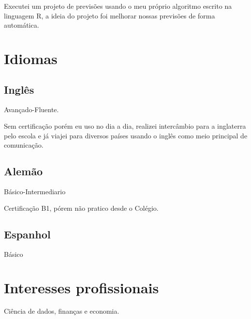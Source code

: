 \documentclass[11pt, a4paper]{awesome-cv}
\begin{document}
Executei um projeto de previsões usando o meu próprio algoritmo escrito na linguagem R, a ideia do projeto foi melhorar nossas previsões de forma automática.

\hypertarget{idiomas}{%
\section{Idiomas}\label{idiomas}}

\hypertarget{ingluxeas}{%
\subsection{Inglês}\label{ingluxeas}}

Avançado-Fluente.

Sem certificação porém eu uso no dia a dia, realizei intercâmbio para a inglaterra pelo escola e já viajei para diversos países usando o inglês como meio principal de comunicação.

\hypertarget{alemuxe3o}{%
\subsection{Alemão}\label{alemuxe3o}}

Básico-Intermediario

Certificação B1, pórem não pratico desde o Colégio.

\hypertarget{espanhol}{%
\subsection{Espanhol}\label{espanhol}}

Básico

\hypertarget{interesses-profissionais}{%
\section{Interesses profissionais}\label{interesses-profissionais}}

Ciência de dados, finanças e economia.
\end{document}

